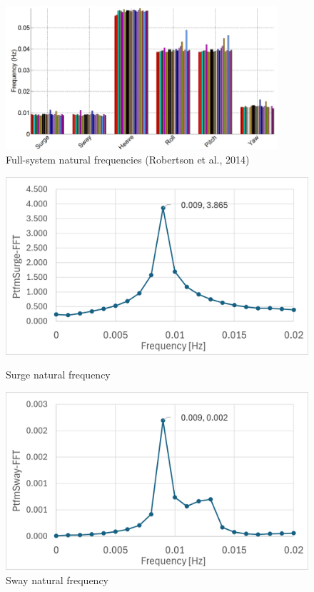 \documentclass[a4paper, 11pt]{article}
\begin{document}

\begin{figure}[H]
    \centering
    \includegraphics[width=0.9\textwidth]{nat_freq.png}
    \caption{\small Full-system natural frequencies (Robertson et al., 2014)}
    \label{fig:nat_freq}
\end{figure}

\begin{figure}[H]
    \begin{minipage}{0.49\textwidth}
        \centering
        \includegraphics[width=1\textwidth]{nat_freq_surge.png}
        \caption{\small Surge natural frequency}
        \label{fig:nat_freq_surge}
    \end{minipage}
    \hfill
    \begin{minipage}{0.5\textwidth}
        \centering
        \includegraphics[width=1\textwidth]{nat_freq_sway.png}
        \caption{\small Sway natural frequency}
        \label{fig:nat_freq_sway}
    \end{minipage}
\end{figure}
\end{document}
